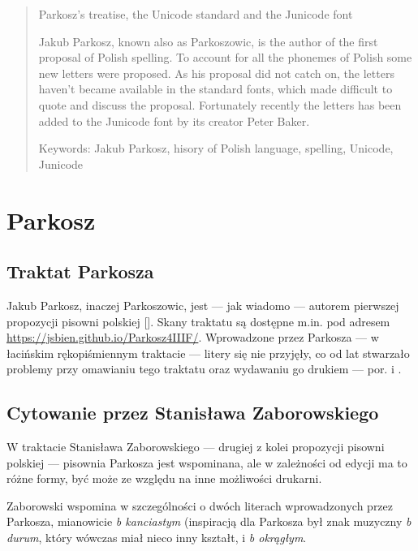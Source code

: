 \begin{quote}
  Parkosz's treatise, the Unicode standard and the Junicode font
  
  Jakub Parkosz, known also as Parkoszowic, is the author of the first
  proposal of Polish spelling. To account for all the phonemes of
  Polish some new letters were proposed. As his proposal did not catch
  on, the letters haven't became available in the standard fonts,
  which made difficult to quote and discuss the proposal. Fortunately
  recently the letters has been added to the Junicode font by its
  creator Peter Baker.

  Keywords: Jakub Parkosz, hisory of Polish language, spelling,
  Unicode, Junicode
\end{quote}

\section{Parkosz}
\label{sec:parkosz}

\subsection{Traktat Parkosza}
\label{sec:traktat-parkosza}

Jakub Parkosz, inaczej Parkoszowic, jest --- jak wiadomo --- autorem
pierwszej propozycji pisowni polskiej [\cite{TraktatPWN1985}]. Skany
traktatu są dostępne m.in. pod adresem
\url{https://jsbien.github.io/Parkosz4IIIF/}. Wprowadzone przez
Parkosza --- w łacińskim rękopiśmiennym traktacie --- litery się nie
przyjęły, co od lat stwarzało problemy przy omawianiu tego traktatu
oraz wydawaniu go drukiem ---
por. \autocite{janusz_s._bien_parkoszs_2022} i
\autocite{bień22:_parkosT}.

\subsection{Cytowanie przez Stanisława Zaborowskiego}
\label{sec:cytow-przez-stan}



W traktacie Stanisława Zaborowskiego --- drugiej z kolei propozycji
pisowni polskiej --- pisownia Parkosza jest wspominana, ale w
zależności od edycji ma to różne formy, być może ze względu na inne
możliwości drukarni.

Zaborowski wspomina w szczególności o dwóch literach wprowadzonych
przez Parkosza, mianowicie \textit{b kanciastym} (inspiracją dla
Parkosza był znak muzyczny \textit{b durum}, który wówczas miał nieco
inny kształt,
i \textit{b
okrągłym}.


